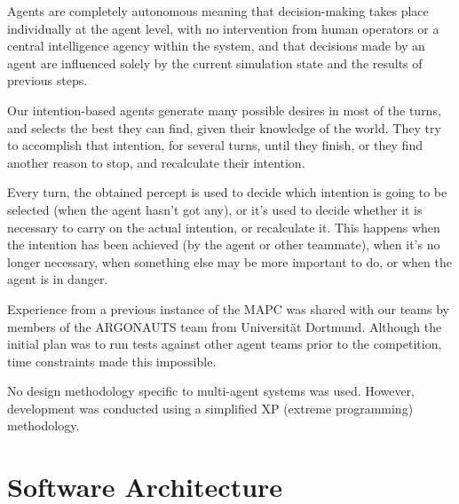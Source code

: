 \documentclass{llncs2e/llncs}
\begin{document}
    Agents are completely autonomous meaning that decision-making takes place 
    individually at the agent level, with no intervention from human operators or 
    a central intelligence agency within the system, and that decisions made by an 
    agent are influenced solely by the current simulation state and the results of 
    previous steps.

    Our intention-based agents generate many possible desires in most of the 
    turns, and selects the best they can find, given their knowledge of the world. 
    They try to accomplish that intention, for several turns, until they finish, 
    or they find another reason to stop, and recalculate their intention.

    Every turn, the obtained percept is used to decide which intention is going to 
    be selected (when the agent hasn't got any), or it's used to decide whether it 
    is necessary to carry on the actual intention, or recalculate it. This happens 
    when the intention has been achieved (by the agent or other teammate), when 
    it's no longer necessary, when something else may be more important to do, or 
    when the agent is in danger.

    Experience from a previous instance of the MAPC was shared with our teams by 
    members of the ARGONAUTS team from Universität Dortmund. Although the initial 
    plan was to run tests against other agent teams prior to the competition, time 
    constraints made this impossible.

    No design methodology specific to multi-agent systems was used. However, 
    development was conducted using a simplified XP (extreme programming) 
    methodology. 


\section{Software Architecture}
\end{document}
